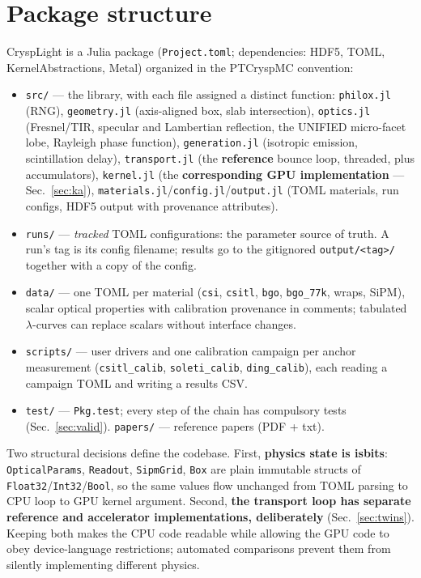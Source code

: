 \documentclass[11pt,a4paper]{article}
\newcommand{\code}[1]{\texttt{#1}}
\begin{document}
\section{Package structure}

CryspLight is a Julia package (\code{Project.toml}; dependencies: HDF5, TOML,
KernelAbstractions, Metal) organized in the PTCryspMC convention:

\begin{itemize}
  \item \code{src/} --- the library, with each file assigned a distinct function:
    \code{philox.jl} (RNG), \code{geometry.jl} (axis-aligned box, slab intersection),
    \code{optics.jl} (Fresnel/TIR, specular and Lambertian reflection, the UNIFIED
    micro-facet lobe, Rayleigh phase function), \code{generation.jl} (isotropic
    emission, scintillation delay), \code{transport.jl} (the \textbf{reference} bounce
    loop, threaded, plus accumulators), \code{kernel.jl} (the \textbf{corresponding GPU implementation} ---
    Sec.~\ref{sec:ka}), \code{materials.jl}/\code{config.jl}/\code{output.jl}
    (TOML materials, run configs, HDF5 output with provenance attributes).
  \item \code{runs/} --- \emph{tracked} TOML configurations: the parameter source of
    truth. A run's tag is its config filename; results go to the gitignored
    \code{output/<tag>/} together with a copy of the config.
  \item \code{data/} --- one TOML per material (\code{csi}, \code{csitl}, \code{bgo},
    \code{bgo\_77k}, wraps, SiPM), scalar optical properties with calibration
    provenance in comments; tabulated $\lambda$-curves can replace scalars without
    interface changes.
  \item \code{scripts/} --- user drivers and one calibration campaign per anchor
    measurement (\code{csitl\_calib}, \code{soleti\_calib}, \code{ding\_calib}),
    each reading a campaign TOML and writing a results CSV.
  \item \code{test/} --- \code{Pkg.test}; every step of the chain has compulsory tests
    (Sec.~\ref{sec:valid}). \code{papers/} --- reference papers (PDF + txt).
\end{itemize}

Two structural decisions define the codebase. First, \textbf{physics state is isbits}:
\code{OpticalParams}, \code{Readout}, \code{SipmGrid}, \code{Box} are plain immutable
structs of \code{Float32}/\code{Int32}/\code{Bool}, so the same values flow unchanged
from TOML parsing to CPU loop to GPU kernel argument. Second, \textbf{the transport
loop has separate reference and accelerator implementations, deliberately}
(Sec.~\ref{sec:twins}). Keeping both makes the CPU code readable while allowing the GPU
code to obey device-language restrictions; automated comparisons prevent them from
silently implementing different physics.
\end{document}
